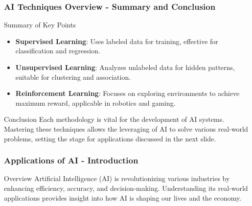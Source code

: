 \documentclass{beamer}
\begin{document}
\begin{frame}[fragile]
    \frametitle{AI Techniques Overview - Summary and Conclusion}
    \begin{block}{Summary of Key Points}
        \begin{itemize}
            \item \textbf{Supervised Learning}: Uses labeled data for training, effective for classification and regression.
            \item \textbf{Unsupervised Learning}: Analyzes unlabeled data for hidden patterns, suitable for clustering and association.
            \item \textbf{Reinforcement Learning}: Focuses on exploring environments to achieve maximum reward, applicable in robotics and gaming.
        \end{itemize}
    \end{block}
    
    \begin{block}{Conclusion}
        Each methodology is vital for the development of AI systems. Mastering these techniques allows the leveraging of AI to solve various real-world problems, setting the stage for applications discussed in the next slide.
    \end{block}
\end{frame}

\begin{frame}[fragile]
    \frametitle{Applications of AI - Introduction}
    \begin{block}{Overview}
        Artificial Intelligence (AI) is revolutionizing various industries by enhancing efficiency, accuracy, and decision-making.
        Understanding its real-world applications provides insight into how AI is shaping our lives and the economy.
    \end{block}
\end{frame}
\end{document}

